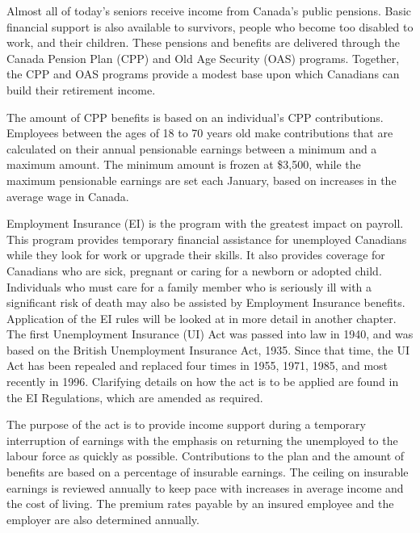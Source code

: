 \documentclass[letterpaper,10pt,english]{sphinxmanual}
\begin{document}
\sphinxAtStartPar
Almost all of today’s seniors receive income from Canada’s public pensions. Basic financial
support is also available to survivors, people who become too disabled to work, and their
children. These pensions and benefits are delivered through the Canada Pension Plan (CPP)
and Old Age Security (OAS) programs. Together, the CPP and OAS programs provide a
modest base upon which Canadians can build their retirement income.

\sphinxAtStartPar
The amount of CPP benefits is based on an individual’s CPP contributions. Employees
between the ages of 18 to 70 years old make contributions that are calculated on their annual
pensionable earnings between a minimum and a maximum amount. The minimum amount is
frozen at \$3,500, while the maximum pensionable earnings are set each January, based on
increases in the average wage in Canada.

\sphinxAtStartPar
Employment Insurance (EI) is the program with the greatest impact on payroll. This program
provides temporary financial assistance for unemployed Canadians while they look for work
or upgrade their skills. It also provides coverage for Canadians who are sick, pregnant or
caring for a newborn or adopted child. Individuals who must care for a family member who
is seriously ill with a significant risk of death may also be assisted by Employment Insurance
benefits. Application of the EI rules will be looked at in more detail in another chapter.
The first Unemployment Insurance (UI) Act was passed into law in 1940, and was based on
the British Unemployment Insurance Act, 1935. Since that time, the UI Act has been repealed
and replaced four times \sphinxhyphen{} in 1955, 1971, 1985, and most recently in 1996. Clarifying details
on how the act is to be applied are found in the EI Regulations, which are amended as
required.

\sphinxAtStartPar
The purpose of the act is to provide income support during a temporary interruption of
earnings with the emphasis on returning the unemployed to the labour force as quickly as
possible. Contributions to the plan and the amount of benefits are based on a percentage of
insurable earnings. The ceiling on insurable earnings is reviewed annually to keep pace with
increases in average income and the cost of living. The premium rates payable by an insured
employee and the employer are also determined annually.
\end{document}
